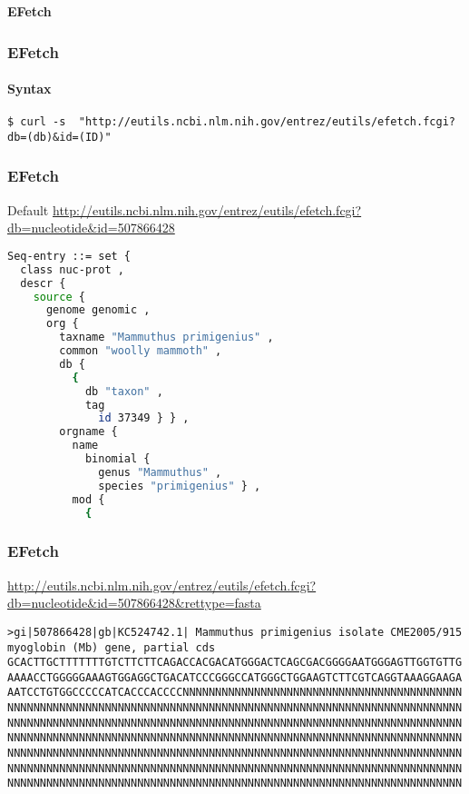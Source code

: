 \documentclass{beamer}
\newcommand{\centeredtitle}[1]{
\begin{center}
    \Huge{\bf{#1}}
\end{center}
}
\newcommand{\hugeslide}[1]{
\begin{frame}
\centeredtitle{#1}
\end{frame}
}
\begin{document}

\hugeslide{EFetch}


\begin{frame}[fragile]
\frametitle{EFetch}
\framesubtitle{Syntax}
\begin{lstlisting}
$ curl -s  "http://eutils.ncbi.nlm.nih.gov/entrez/eutils/efetch.fcgi?db=(db)&id=(ID)" 
\end{lstlisting}
\end{frame}

\begin{frame}[fragile]
\frametitle{EFetch}
Default 
\url{http://eutils.ncbi.nlm.nih.gov/entrez/eutils/efetch.fcgi?db=nucleotide&id=507866428}
\begin{lstlisting}[language=bash,basicstyle=\tiny,breaklines=true]
Seq-entry ::= set {
  class nuc-prot ,
  descr {
    source {
      genome genomic ,
      org {
        taxname "Mammuthus primigenius" ,
        common "woolly mammoth" ,
        db {
          {
            db "taxon" ,
            tag
              id 37349 } } ,
        orgname {
          name
            binomial {
              genus "Mammuthus" ,
              species "primigenius" } ,
          mod {
            {

\end{lstlisting}
\end{frame}

\begin{frame}[fragile]
\frametitle{EFetch}
\url{http://eutils.ncbi.nlm.nih.gov/entrez/eutils/efetch.fcgi?db=nucleotide&id=507866428&rettype=fasta}
\begin{lstlisting}[basicstyle=\tiny,breaklines=true]
>gi|507866428|gb|KC524742.1| Mammuthus primigenius isolate CME2005/915 myoglobin (Mb) gene, partial cds
GCACTTGCTTTTTTTGTCTTCTTCAGACCACGACATGGGACTCAGCGACGGGGAATGGGAGTTGGTGTTG
AAAACCTGGGGGAAAGTGGAGGCTGACATCCCGGGCCATGGGCTGGAAGTCTTCGTCAGGTAAAGGAAGA
AATCCTGTGGCCCCCATCACCCACCCCNNNNNNNNNNNNNNNNNNNNNNNNNNNNNNNNNNNNNNNNNNN
NNNNNNNNNNNNNNNNNNNNNNNNNNNNNNNNNNNNNNNNNNNNNNNNNNNNNNNNNNNNNNNNNNNNNN
NNNNNNNNNNNNNNNNNNNNNNNNNNNNNNNNNNNNNNNNNNNNNNNNNNNNNNNNNNNNNNNNNNNNNN
NNNNNNNNNNNNNNNNNNNNNNNNNNNNNNNNNNNNNNNNNNNNNNNNNNNNNNNNNNNNNNNNNNNNNN
NNNNNNNNNNNNNNNNNNNNNNNNNNNNNNNNNNNNNNNNNNNNNNNNNNNNNNNNNNNNNNNNNNNNNN
NNNNNNNNNNNNNNNNNNNNNNNNNNNNNNNNNNNNNNNNNNNNNNNNNNNNNNNNNNNNNNNNNNNNNN
NNNNNNNNNNNNNNNNNNNNNNNNNNNNNNNNNNNNNNNNNNNNNNNNNNNNNNNNNNNNNNNNNNNNNN
\end{lstlisting}
\end{frame}
\end{document}
